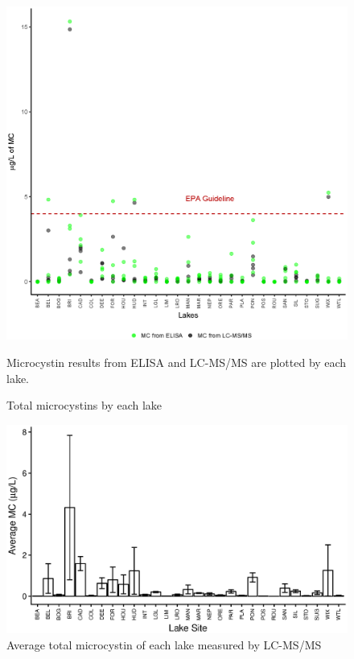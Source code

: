 \begin{figure}[!ht]
\includegraphics[scale=0.8]{figures/Microcystin}
\caption{Total microcystins by each lake}
\label{microcystin}
Microcystin results from ELISA and LC-MS/MS are plotted by each lake.
\end{figure}

\begin{figure}[!ht]
\includegraphics{figures/barmcsum}
\caption{Average total microcystin of each lake measured by LC-MS/MS}
\label{mcbar}
\end{figure}



